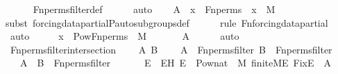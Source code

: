 \begin{isabellebody}
\ \ \ \ \isamarkupfalse%
\ Fn{\isacharunderscore}{\kern0pt}perms{\isacharunderscore}{\kern0pt}filter{\isacharunderscore}{\kern0pt}def\isanewline
\ \ \ \ \isamarkupfalse%
\ auto\isanewline
\ \ \isamarkupfalse%
\ {\isachardoublequoteopen}{\isacharquery}{\kern0pt}A\ {\isasymlongrightarrow}\ x\ {\isasymsubseteq}\ Fn{\isacharunderscore}{\kern0pt}perms\ {\isasymand}\ x\ {\isasymin}\ M{\isachardoublequoteclose}\ \isanewline
\ \ \ \ \isamarkupfalse%
{\isacharparenleft}{\kern0pt}subst\ forcing{\isacharunderscore}{\kern0pt}data{\isacharunderscore}{\kern0pt}partial{\isachardot}{\kern0pt}P{\isacharunderscore}{\kern0pt}auto{\isacharunderscore}{\kern0pt}subgroups{\isacharunderscore}{\kern0pt}def{\isacharparenright}{\kern0pt}\isanewline
\ \ \ \ \ \isamarkupfalse%
{\isacharparenleft}{\kern0pt}rule\ Fn{\isacharunderscore}{\kern0pt}forcing{\isacharunderscore}{\kern0pt}data{\isacharunderscore}{\kern0pt}partial{\isacharparenright}{\kern0pt}\isanewline
\ \ \ \ \isamarkupfalse%
\ auto\isanewline
\ \ \isamarkupfalse%
\ \isamarkupfalse%
\ {\isachardoublequoteopen}x\ {\isasymin}\ Pow{\isacharparenleft}{\kern0pt}Fn{\isacharunderscore}{\kern0pt}perms{\isacharparenright}{\kern0pt}\ {\isasyminter}\ M{\isachardoublequoteclose}\ \isanewline
\ \ \ \ \isamarkupfalse%
\ {\isacartoucheopen}{\isacharquery}{\kern0pt}A{\isacartoucheclose}\isanewline
\ \ \ \ \isamarkupfalse%
\ auto\isanewline
{}\isamarkupfalse%
%
\endisatagproof
{\isafoldproof}%
%
\isadelimproof
\isanewline
%
\endisadelimproof
\isanewline
{}\isamarkupfalse%
\ Fn{\isacharunderscore}{\kern0pt}perms{\isacharunderscore}{\kern0pt}filter{\isacharunderscore}{\kern0pt}intersection\ {\isacharcolon}{\kern0pt}\isanewline
\ \ \ A\ B\ \isanewline
\ \ \ {\isachardoublequoteopen}A\ {\isasymin}\ Fn{\isacharunderscore}{\kern0pt}perms{\isacharunderscore}{\kern0pt}filter{\isachardoublequoteclose}\ {\isachardoublequoteopen}B\ {\isasymin}\ Fn{\isacharunderscore}{\kern0pt}perms{\isacharunderscore}{\kern0pt}filter{\isachardoublequoteclose}\ \isanewline
\ \ \ {\isachardoublequoteopen}A\ {\isasyminter}\ B\ {\isasymin}\ Fn{\isacharunderscore}{\kern0pt}perms{\isacharunderscore}{\kern0pt}filter{\isachardoublequoteclose}\ \isanewline
%
\isadelimproof
%
\endisadelimproof
%
\isatagproof
{}\isamarkupfalse%
{\isacharminus}{\kern0pt}\ \isanewline
\ \ \isamarkupfalse%
\ E\ \ EH{\isacharcolon}{\kern0pt}\ {\isachardoublequoteopen}E\ {\isasymin}\ Pow{\isacharparenleft}{\kern0pt}nat{\isacharparenright}{\kern0pt}\ {\isasyminter}\ M{\isachardoublequoteclose}\ {\isachardoublequoteopen}finite{\isacharunderscore}{\kern0pt}M{\isacharparenleft}{\kern0pt}E{\isacharparenright}{\kern0pt}{\isachardoublequoteclose}\ {\isachardoublequoteopen}Fix{\isacharparenleft}{\kern0pt}E{\isacharparenright}{\kern0pt}\ {\isasymsubseteq}\ A{\isachardoublequoteclose}\isanewline

\end{isabellebody}

